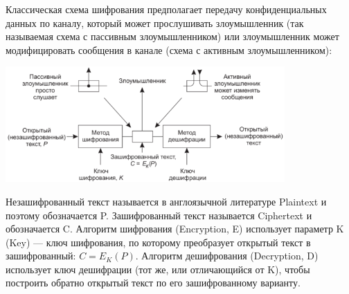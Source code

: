 \documentclass{../mcstext}
\begin{document}
Классическая схема шифрования предполагает передачу конфиденциальных данных по каналу, который может прослушивать злоумышленник (так называемая схема с пассивным злоумышленником) или злоумышленник может модифицировать сообщения в канале (схема с активным злоумышленником):

\begin{center}
    \includegraphics[width=0.8\textwidth]{cryptography.png}
\end{center}

Незашифрованный текст называется в англоязычной литературе Plaintext и поэтому обозначается P. Зашифрованный текст называется Ciphertext и обозначается C. Алгоритм шифрования (Encryption, E) использует параметр K (Key) --- ключ шифрования, по которому преобразует открытый текст в зашифрованный: $C = E_K(P)$. Алгоритм дешифрования (Decryption, D) использует ключ дешифрации (тот же, или отличающийся от K), чтобы построить обратно открытый текст по его зашифрованному варианту.
\end{document}
